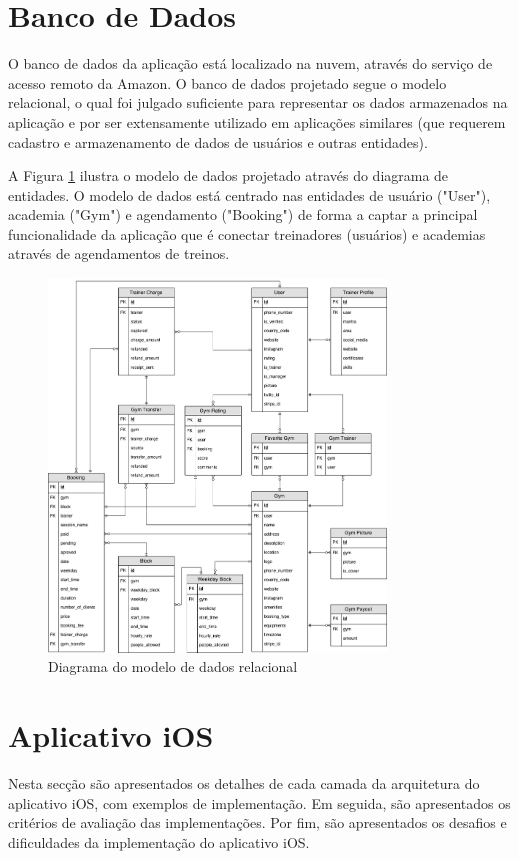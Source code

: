 \section{Banco de Dados}
O banco de dados da aplicação está localizado na nuvem, através do serviço de acesso remoto da Amazon. O banco de dados projetado segue o modelo relacional, o qual foi julgado suficiente para representar os dados armazenados na aplicação e por ser extensamente utilizado em aplicações similares (que requerem cadastro e armazenamento de dados de usuários e outras entidades).

A Figura \ref{fig:database} ilustra o modelo de dados projetado através do diagrama de entidades. O modelo de dados está centrado nas entidades de usuário ("User"), academia ("Gym") e agendamento ("Booking") de forma a captar a principal funcionalidade da aplicação que é conectar treinadores (usuários) e academias através de agendamentos de treinos.

\begin{figure}[H]
    \centering
    \includegraphics[width=0.8\textwidth]{pfc/figuras/database-schema.png}
    \caption{Diagrama do modelo de dados relacional}
    \label{fig:database}
\end{figure}

\section{Aplicativo iOS}
Nesta secção são apresentados os detalhes de cada camada da arquitetura do aplicativo iOS, com exemplos de implementação. Em seguida, são apresentados os critérios de avaliação das implementações. Por fim, são apresentados os desafios e dificuldades da implementação do aplicativo iOS.

